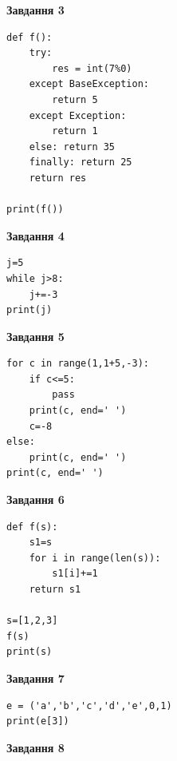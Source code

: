 \documentclass[12pt, ukrainian]{article}
\begin{document}
{{{\begin{minipage}[t]{7.5cm}
\begin{center}
\textbf{Завдання 3}
\end{center}

\begin{verbatim}
def f():
    try:
        res = int(7%0)
    except BaseException: 
        return 5
    except Exception: 
        return 1
    else: return 35
    finally: return 25
    return res

print(f())
\end{verbatim}



\begin{center}
\textbf{Завдання 4}
\end{center}

\begin{verbatim}
j=5
while j>8:
    j+=-3
print(j)
\end{verbatim}

\end{minipage}
\vline \hspace{6mm}
\begin{minipage}[t]{10.5cm}

\begin{center}
\textbf{Завдання 5}
\end{center}

\begin{verbatim}
for c in range(1,1+5,-3):
    if c<=5:
        pass
    print(c, end=' ')
    c=-8
else:
    print(c, end=' ')
print(c, end=' ')
\end{verbatim}



\begin{center}
\textbf{Завдання 6}
\end{center}

\begin{verbatim}
def f(s):
    s1=s
    for i in range(len(s)):
        s1[i]+=1
    return s1

s=[1,2,3]
f(s)
print(s)
\end{verbatim}



\begin{center}
\textbf{Завдання 7}
\end{center}

\begin{verbatim}
e = ('a','b','c','d','e',0,1)
print(e[3])
\end{verbatim}



\begin{center}
\textbf{Завдання 8}
\end{center}


\end{minipage}}}}
\end{document}
